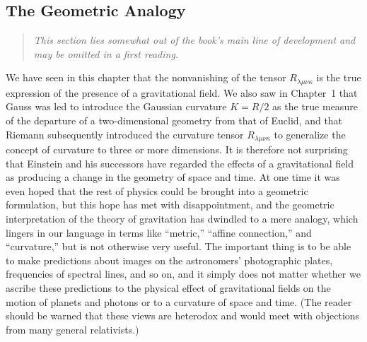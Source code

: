
\subsection{The Geometric Analogy\optionalreading}\label{sec:6.9}

\begin{quote}
\small\emph{This section lies somewhat out of the book's main line of
development and may be omitted in a first reading.}
\end{quote}

We have seen in this chapter that the nonvanishing of the tensor
\(R_{\lambda\mu\nu\kappa}\) is the true expression of the presence of a
gravitational field. We also saw in Chapter~1 that Gauss was led to introduce
the Gaussian curvature \(K=R/2\) as the true measure of the departure of a
two-dimensional geometry from that of Euclid, and that Riemann subsequently
introduced the curvature tensor \(R_{\lambda\mu\nu\kappa}\) to generalize the
concept of curvature to three or more dimensions. It is therefore not
surprising that Einstein and his successors have regarded the effects of a
gravitational field as producing a change in the geometry of space and time.
At one time it was even hoped that the rest of physics could be brought into
a geometric formulation, but this hope has met with disappointment, and the
geometric interpretation of the theory of gravitation has dwindled to a mere
analogy, which lingers in our language in terms like ``metric,'' ``affine
connection,'' and ``curvature,'' but is not otherwise very useful. The
important thing is to be able to make predictions about images on the
astronomers' photographic plates, frequencies of spectral lines, and so on,
and it simply does not matter whether we ascribe these predictions to the
physical effect of gravitational fields on the motion of planets and photons
or to a curvature of space and time. (The reader should be warned that these
views are heterodox and would meet with objections from many general
relativists.)

